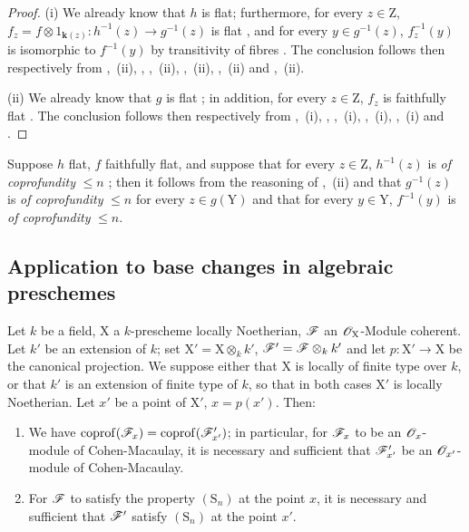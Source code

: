 \begin{proof}
(i) We already know  that $h$ is flat; furthermore, for every $z\in\mathrm{Z}$, $f_z=f\otimes 1_{\boldsymbol{k}(z)}:h^{-1}(z)\to g^{-1}(z)$ is flat , and for every $y\in g^{-1}(z)$, $f_z^{-1}(y)$ is isomorphic to $f^{-1}(y)$ by transitivity of fibres . The conclusion follows then respectively from ,~(ii), , ,~(ii), ,~(ii), ,~(ii) and ,~(ii).

(ii) We already know that $g$ is flat ; in addition, for every $z\in\mathrm{Z}$, $f_z$ is faithfully flat . The conclusion follows then respectively from ,~(i), , ,~(i), ,~(i), ,~(i) and .
\end{proof}

\begin{remark}[6.6.2]
\label{IV.6.6.2}
Suppose $h$ flat, $f$ faithfully flat, and suppose that for every $z\in\mathrm{Z}$, $h^{-1}(z)$ is \emph{of coprofundity} $\leqslant n$ ; then it follows from the reasoning of ,~(ii) and  that $g^{-1}(z)$ is \emph{of coprofundity} $\leqslant n$ for every $z\in g(\mathrm{Y})$ and that for every $y\in\mathrm{Y}$, $f^{-1}(y)$ is \emph{of coprofundity} $\leqslant n$.
\end{remark}

\subsection{Application to base changes in algebraic preschemes}
\label{subsection:IV.6.7}

\begin{proposition}[6.7.1]
\label{IV.6.7.1}
Let $k$ be a field, $\mathrm{X}$ a $k$-prescheme locally Noetherian, $\mathscr{F}$ an $\mathscr{O}_\mathrm{X}$-Module coherent. Let $k'$ be an extension of $k$; set $\mathrm{X}'=\mathrm{X}\otimes_k k'$, $\mathscr{F}'=\mathscr{F}\otimes_k k'$ and let $p:\mathrm{X}'\to\mathrm{X}$ be the canonical projection. We suppose either that $\mathrm{X}$ is locally of finite type over $k$, or that $k'$ is an extension of finite type of $k$, so that in both cases $\mathrm{X}'$ is locally Noetherian. Let $x'$ be a point of $\mathrm{X}'$, $x=p(x')$. Then:
\begin{enumerate}[label=\textup{(\roman*)}]
  \item We have $\operatorname{coprof}(\mathscr{F}_x)=\operatorname{coprof}(\mathscr{F}'_{x'})$; in particular, for $\mathscr{F}_x$ to be an $\mathscr{O}_x$-module of Cohen-Macaulay, it is necessary and sufficient that $\mathscr{F}'_{x'}$ be an $\mathscr{O}_{x'}$-module of Cohen-Macaulay.
  \item For $\mathscr{F}$ to satisfy the property $(\mathrm{S}_n)$ at the point $x$, it is necessary and sufficient that $\mathscr{F}'$ satisfy $(\mathrm{S}_n)$ at the point $x'$.
\end{enumerate}
\end{proposition}

